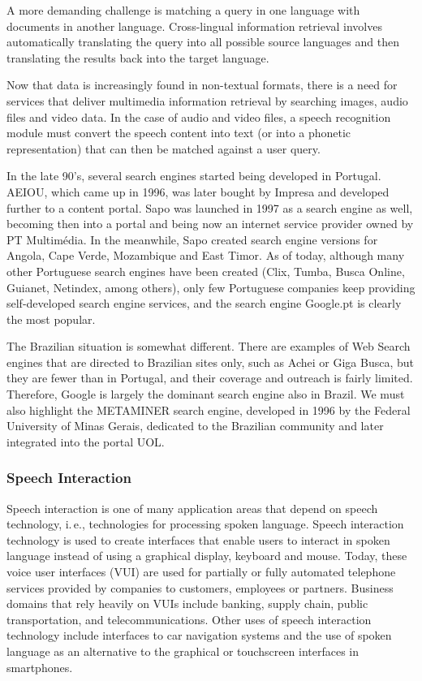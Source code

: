 \documentclass[]{../metanetpaper}
\begin{document}
\begin{multicols}{2}
   A more demanding challenge is matching a query in one language with documents in another language. Cross-lingual information retrieval involves automatically translating the query into all possible source languages and then translating the results back into the target language. 

   Now that data is increasingly found in non-textual formats, there is a need for services that deliver multimedia information retrieval by searching images, audio files and video data. In the case of audio and video files, a speech recognition module must convert the speech content into text (or into a phonetic representation) that can then be matched against a user query.

   In the late 90's, several search engines started being developed in Portugal. AEIOU, which came up in 1996, was later bought by Impresa and developed further to a content portal\cite{aeiou}. Sapo was launched in 1997 as a search engine as well, becoming then into a portal and being now an internet service provider owned by PT Multimédia\cite{sapo}. In the meanwhile, Sapo created search engine versions for Angola, Cape Verde, Mozambique and East Timor. As of today, although many other Portuguese search engines have been created (Clix, Tumba, Busca Online, Guianet, Netindex, among others)\cite{colossus}, only few Portuguese companies keep providing self-developed search engine services, and the search engine Google.pt is clearly the most popular.

The Brazilian situation is somewhat different. There are examples of Web Search engines that are directed to Brazilian sites only, such as Achei\cite{achei} or Giga Busca\cite{busca}, but they are fewer than in Portugal, and their coverage and outreach is fairly limited. Therefore, Google is largely the dominant search engine also in Brazil. We must also highlight the METAMINER  search engine, developed in 1996 by the Federal University of Minas Gerais, dedicated to the Brazilian community and later integrated into the portal UOL.

\subsubsection{Speech Interaction}

Speech interaction is one of many application areas that depend on speech technology, i.\,e., technologies for processing spoken language. Speech interaction technology is used to create interfaces that enable users to interact in spoken language instead of using a graphical display, keyboard and mouse.  Today, these voice user interfaces (VUI) are used for partially or fully automated telephone services provided by companies to customers, employees or partners. Business domains that rely heavily on VUIs include banking, supply chain, public transportation, and telecommunications. Other uses of speech interaction technology include interfaces to car navigation systems and the use of spoken language as an alternative to the graphical or touchscreen interfaces in smartphones.


\end{multicols}
\end{document}

